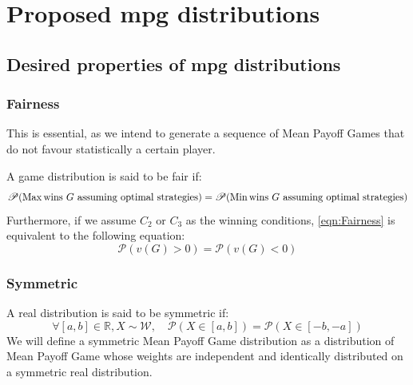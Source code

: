 
\section{Proposed \acrshort{mpg} distributions}
\subsection{Desired properties of \acrshort{mpg} distributions}
\label{section:Dataset:ProposedDistributions:Properties}
\subsubsection{Fairness}
This is essential, as we intend to generate a sequence of Mean Payoff Games that do not favour statistically a certain player.

A game distribution is said to be fair if:
\begin{equation}
	\label{eqn:Fairness}
	\mathscr{P}(\operatorname{Max} \text{wins}\ G \ \text{assuming optimal strategies} ) = 	\mathscr{P}(\operatorname{Min} \text{wins}\ G \ \text{assuming optimal strategies} )
\end{equation}
Furthermore, if we assume $C_2$ or $C_3$ as the winning conditions, \eqref{eqn:Fairness} is equivalent to the following equation:
\begin{equation*}
	\mathscr{P}(v(G) > 0) = \mathscr{P}(v(G) < 0)
\end{equation*}
\subsubsection{Symmetric}
A real distribution is said to be symmetric if:
$$
\forall [a,b]\in \mathbb{R},X\sim \mathcal{W},\quad \mathscr{P}(X\in [a,b]) = \mathscr{P}(X\in [-b,-a])
$$
We will define a symmetric Mean Payoff Game distribution as a distribution of Mean Payoff Game whose weights are independent and identically distributed on a symmetric real distribution.

